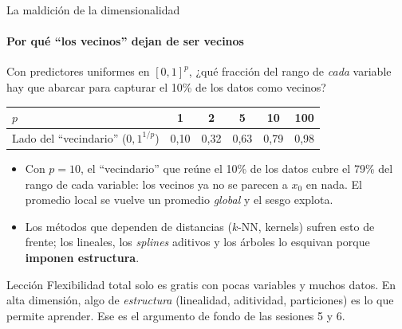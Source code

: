 \documentclass{beamer}
\newcommand{\1}{\mathbb{I}}
\begin{document}
\begin{frame}{La maldición de la dimensionalidad}
\framesubtitle{Por qué ``los vecinos'' dejan de ser vecinos}
\small
Con predictores uniformes en $[0,1]^p$, ¿qué fracción del rango de \emph{cada} variable hay que abarcar para capturar el 10\% de los datos como vecinos?
\vspace{0.1cm}
\begin{center}
\footnotesize
\begin{tabular}{lccccc}
\hline
$p$ & 1 & 2 & 5 & 10 & 100 \\
\hline
Lado del ``vecindario'' ($0{,}1^{1/p}$) & 0,10 & 0,32 & 0,63 & 0,79 & 0,98 \\
\hline
\end{tabular}
\end{center}
\pause
\vspace{0.15cm}
\begin{itemize}\itemsep4pt
  \item Con $p = 10$, el ``vecindario'' que reúne el 10\% de los datos cubre el 79\% del rango de cada variable: los vecinos ya no se parecen a $x_0$ en nada. El promedio local se vuelve un promedio \emph{global} y el sesgo explota.
  \item Los métodos que dependen de distancias ($k$-NN, kernels) sufren esto de frente; los lineales, los \emph{splines} aditivos y los árboles lo esquivan porque \textbf{imponen estructura}. \pause
\end{itemize}
\begin{block}{Lección}
Flexibilidad total solo es gratis con pocas variables y muchos datos. En alta dimensión, algo de \emph{estructura} (linealidad, aditividad, particiones) es lo que permite aprender. Ese es el argumento de fondo de las sesiones 5 y 6.
\end{block}
\end{frame}
\end{document}
